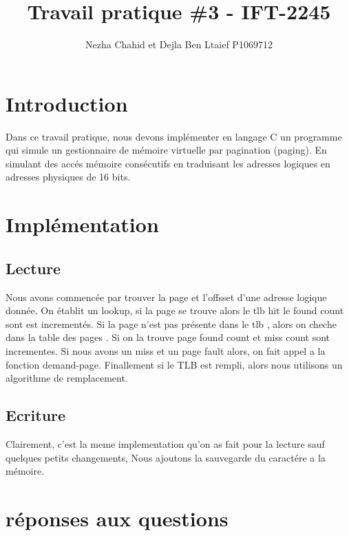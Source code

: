\documentclass{article}
\title{Travail pratique \#3 - IFT-2245}
\author{Nezha Chahid et Dejla Ben Ltaief P1069712}
\begin{document}
\maketitle
\section {Introduction}
Dans ce travail pratique, nous devons impl\'{e}menter en langage C un programme qui simule un gestionnaire de m\'{e}moire virtuelle par pagination (paging). En
simulant des acc\'{e}s m\'{e}moire cons\'{e}cutifs en traduisant les adresses logiques en adresses physiques de 16 bits.
\section {Impl\'{e}mentation}
\subsection{Lecture}
Nous avons commenc\'{e}e par trouver la page et l'offsset d'une adresse logique donn\'{e}e.
On \'{e}tablit un lookup, si la page se trouve alors le tlb hit  le found count sont est increment\'{e}s.
Si la page n'est pas pr\'{e}sente dans le tlb , alors on cheche dans la table des pages . Si on la trouve page found count et miss count sont  incrementes. Si nous avons un miss et un page fault alors, on fait appel a la fonction demand-page.
Finallement si le TLB est rempli, alors nous utilisons un algorithme de remplacement.
\subsection{Ecriture}
Clairement, c'est la meme implementation qu'on as fait pour la lecture sauf quelques petits changements, Nous ajoutons la sauvegarde du caract\'{e}re a la m\'{e}moire.
\section {r\'{e}ponses aux questions}
\end{document}
